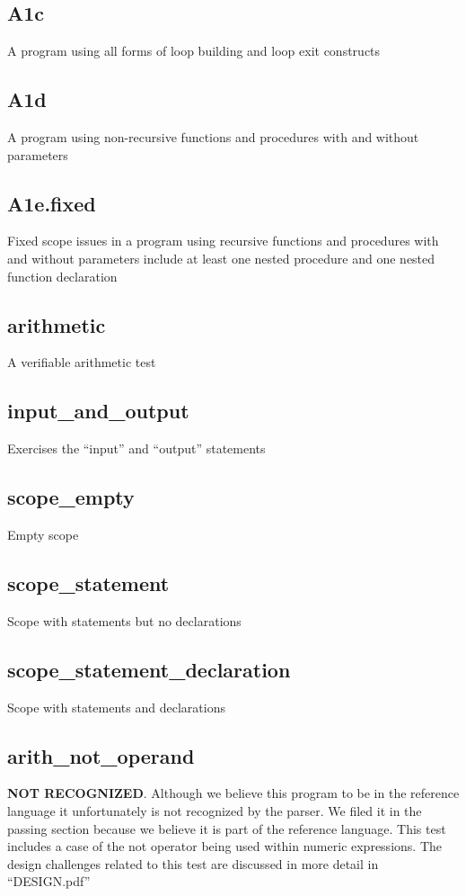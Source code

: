 \documentclass[oneside]{amsart}
\theoremstyle{definition}
\theoremstyle{remark}
\numberwithin{equation}{section}
\begin{document}
\subsection{A1c} A program using all forms of loop building and loop exit constructs
\subsection{A1d} A program using non-recursive functions and procedures with and without parameters
\subsection{A1e.fixed} Fixed scope issues in a program using recursive functions and procedures with and without parameters include at least one nested procedure and one nested function declaration
\subsection{arithmetic} A verifiable arithmetic test
\subsection{input\_and\_output} Exercises the ``input'' and ``output'' statements
\subsection{scope\_empty} Empty scope
\subsection{scope\_statement} Scope with statements but no declarations
\subsection{scope\_statement\_declaration} Scope with statements and declarations

\subsection{arith\_not\_operand} \textbf{NOT RECOGNIZED}.
Although we believe this program to be in the reference language it unfortunately is not recognized
by the parser. We filed it in the passing section because we believe it is part of the reference
language. This test includes a case of the not operator being used within numeric expressions. The
design challenges related to this test are discussed in more detail in ``DESIGN.pdf''

\end{document}
